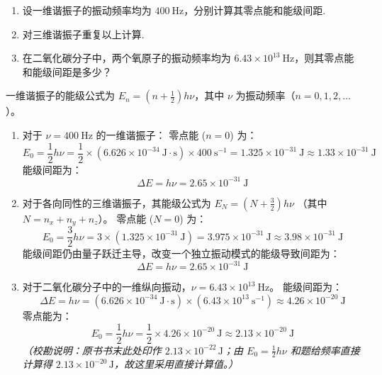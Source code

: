 \begin{exercise}\label{ex:24.7}
\begin{enumerate}
  \item[(a)] 设一维谐振子的振动频率均为 $400 \ \mathrm{Hz}$，分别计算其零点能和能级间距. 
  \item[(b)] 对三维谐振子重复以上计算. 
  \item[(c)] 在二氧化碳分子中，两个氧原子的振动频率均为 $6.43 \times 10^{13} \ \mathrm{Hz}$，则其零点能和能级间距是多少？
\end{enumerate}
\end{exercise}
\begin{solution}
一维谐振子的能级公式为 $E_n = \left(n + \frac{1}{2}\right)h\nu$，其中 $\nu$ 为振动频率（$n = 0, 1, 2, \ldots$）。

\begin{enumerate}
    \item[(a)] 对于 $\nu = 400 \ \mathrm{Hz}$ 的一维谐振子：
    零点能 ($n=0$) 为：
    $$ E_0 = \frac{1}{2} h\nu = \frac{1}{2} \times (6.626 \times 10^{-34} \ \mathrm{J \cdot s}) \times 400 \ \mathrm{s^{-1}} = 1.325 \times 10^{-31} \ \mathrm{J} \approx 1.33 \times 10^{-31} \ \mathrm{J} $$
    能级间距为：
    $$ \Delta E = h\nu = 2.65 \times 10^{-31} \ \mathrm{J} $$

    \item[(b)] 对于各向同性的三维谐振子，其能级公式为 $E_N = \left(N + \frac{3}{2}\right)h\nu$ （其中 $N = n_x + n_y + n_z$）。
    零点能 ($N=0$) 为：
    $$ E_0 = \frac{3}{2} h\nu = 3 \times \left(1.325 \times 10^{-31} \ \mathrm{J}\right) = 3.975 \times 10^{-31} \ \mathrm{J} \approx 3.98 \times 10^{-31} \ \mathrm{J} $$
    能级间距仍由量子跃迁主导，改变一个独立振动模式的能级导致间距为：
    $$ \Delta E = h\nu = 2.65 \times 10^{-31} \ \mathrm{J} $$

    \item[(c)] 对于二氧化碳分子中的一维纵向振动，$\nu = 6.43 \times 10^{13} \ \mathrm{Hz}$。
    能级间距为：
    $$ \Delta E = h\nu = (6.626 \times 10^{-34} \ \mathrm{J \cdot s}) \times (6.43 \times 10^{13} \ \mathrm{s^{-1}}) \approx 4.26 \times 10^{-20} \ \mathrm{J} $$
    零点能为：
    $$ E_0 = \frac{1}{2} h\nu = \frac{1}{2} \times 4.26 \times 10^{-20} \ \mathrm{J} \approx 2.13 \times 10^{-20} \ \mathrm{J} $$
    \textit{（校勘说明：原书书末此处印作 $2.13\times10^{-22}\,\mathrm{J}$；由 $E_0=\tfrac12h\nu$ 和题给频率直接计算得 $2.13\times10^{-20}\,\mathrm{J}$，故这里采用直接计算值。）}
\end{enumerate}
\end{solution}




